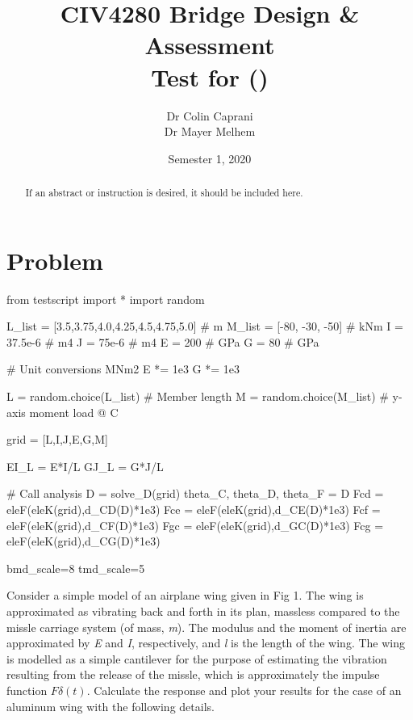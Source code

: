 \documentclass[a4paper,11pt]{article}
\title{CIV4280 Bridge Design \& Assessment\\Test for \VAR{FullName} (\VAR{StudentID})}
\date{Semester 1, 2020}
\author{Dr Colin Caprani\\Dr Mayer Melhem}
\begin{document}
\maketitle

\begin{abstract}



If an abstract or instruction is desired, it should be included here.
\end{abstract}

\newpage

\section{Problem}

\begin{pycode}
	from testscript import *
	import random
	
	L_list = [3.5,3.75,4.0,4.25,4.5,4.75,5.0]  # m
	M_list = [-80, -30, -50]	# kNm
	I = 37.5e-6 	# m4
	J = 75e-6   	# m4
	E = 200     	# GPa
	G = 80      	# GPa
	
	# Unit conversions MNm2
	E *= 1e3
	G *= 1e3
	
	L = random.choice(L_list) 		# Member length
	M = random.choice(M_list) 		# y-axis moment load @ C
	
	grid = [L,I,J,E,G,M]
	
	EI_L = E*I/L
	GJ_L = G*J/L
	
	# Call analysis
	D = solve_D(grid)
	theta_C, theta_D, theta_F = D
	Fcd = eleF(eleK(grid),d_CD(D)*1e3)
	Fce = eleF(eleK(grid),d_CE(D)*1e3)
	Fcf = eleF(eleK(grid),d_CF(D)*1e3)
	Fgc = eleF(eleK(grid),d_GC(D)*1e3)
	Fcg = eleF(eleK(grid),d_CG(D)*1e3)
	
	bmd_scale=8
	tmd_scale=5
\end{pycode}

Consider a simple model of an airplane wing given in Fig 1. The wing is approximated as vibrating back and forth in its plan, massless compared to the missle carriage system (of mass, \emph{m}). The modulus and the moment of inertia are approximated by \emph{E} and \emph{I}, respectively, and \emph{l} is the length of the wing. The wing is modelled as a simple cantilever for the purpose of estimating the vibration resulting from the release of the missle, which is approximately the impulse function $\mathit{F\delta(t)}$.\hfill \break \break
Calculate the response and plot your results for the case of an aluminum wing with the following details.
\end{document}
